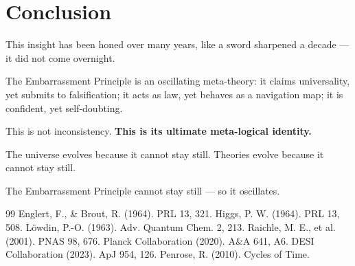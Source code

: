 \documentclass[10pt,a4paper]{article}
\begin{document}
\section*{Conclusion}
This insight has been honed over many years, like a sword sharpened a decade --- it did not come overnight.

The Embarrassment Principle is an oscillating meta-theory:
it claims universality, yet submits to falsification;
it acts as law, yet behaves as a navigation map;
it is confident, yet self-doubting.

This is not inconsistency.
\textbf{This is its ultimate meta-logical identity.}

The universe evolves because it cannot stay still.
Theories evolve because it cannot stay still.

The Embarrassment Principle cannot stay still --- so it oscillates.

\begin{thebibliography}{99}
 Englert, F., \& Brout, R. (1964). PRL 13, 321.
 Higgs, P. W. (1964). PRL 13, 508.
 Löwdin, P.-O. (1963). Adv. Quantum Chem. 2, 213.
 Raichle, M. E., et al. (2001). PNAS 98, 676.
 Planck Collaboration (2020). A\&A 641, A6.
 DESI Collaboration (2023). ApJ 954, 126.
 Penrose, R. (2010). Cycles of Time.
\end{thebibliography}
\end{document}
